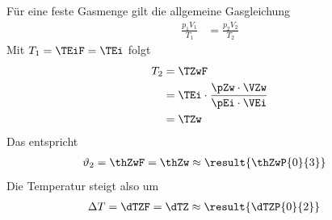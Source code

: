 Für eine feste Gasmenge gilt die allgemeine Gasgleichung
\begin{align}
 \frac{p_1V_1}{T_1} &= \frac{p_2V_2}{T_2}
\end{align}
Mit $T_1 = \TEiF = \TEi$ folgt
\begin{align}
 T_2 &= \TZwF \\
   &= \TEi\cdot\frac{\pZw\cdot\VZw}{\pEi\cdot\VEi} \\
   &= \TZw
\end{align}
Das entspricht
\begin{align}
 \vartheta_2 &= \thZwF = \thZw \approx \result{\thZwP{0}{3}}
\end{align}
Die Temperatur steigt also um
\begin{align}
 \Delta T &= \dTZF = \dTZ \approx \result{\dTZP{0}{2}}
\end{align}
